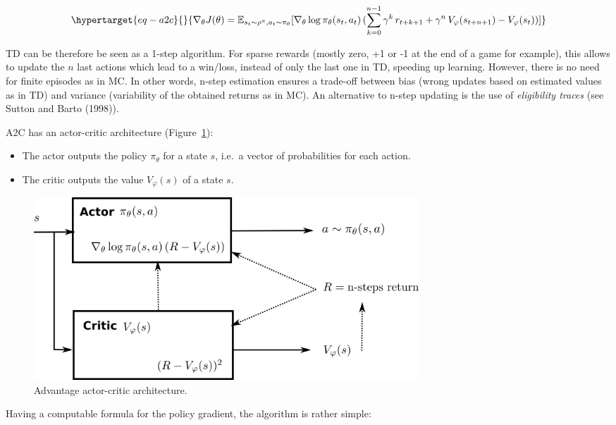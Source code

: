 \documentclass[
  letterpaper,
  DIV=11,
  numbers=noendperiod]{scrreprt}
\providecommand{\tightlist}{%
  \setlength{\itemsep}{0pt}\setlength{\parskip}{0pt}}\usepackage{longtable,booktabs,array}
\begin{document}
\begin{equation}\protect\hypertarget{eq-a2c}{}{
    \nabla_\theta J(\theta) =  \mathbb{E}_{s_t \sim \rho^\pi, a_t \sim \pi_\theta}[\nabla_\theta \log \pi_\theta(s_t, a_t) \, ( \sum_{k=0}^{n-1} \gamma^{k} \, r_{t+k+1} + \gamma^n \, V_\varphi(s_{t+n+1}) - V_\varphi(s_t))]
}\label{eq-a2c}\end{equation}

TD can be therefore be seen as a 1-step algorithm. For sparse rewards
(mostly zero, +1 or -1 at the end of a game for example), this allows to
update the \(n\) last actions which lead to a win/loss, instead of only
the last one in TD, speeding up learning. However, there is no need for
finite episodes as in MC. In other words, n-step estimation ensures a
trade-off between bias (wrong updates based on estimated values as in
TD) and variance (variability of the obtained returns as in MC). An
alternative to n-step updating is the use of \emph{eligibility traces}
(see Sutton and Barto (1998)).

A2C has an actor-critic architecture (Figure~\ref{fig-a3c}):

\begin{itemize}
\tightlist
\item
  The actor outputs the policy \(\pi_\theta\) for a state \(s\), i.e.~a
  vector of probabilities for each action.
\item
  The critic outputs the value \(V_\varphi(s)\) of a state \(s\).
\end{itemize}

\begin{figure}

{\centering \includegraphics[width=0.7\textwidth,height=\textheight]{./img/a3c.png}

}

\caption{\label{fig-a3c}Advantage actor-critic architecture.}

\end{figure}

Having a computable formula for the policy gradient, the algorithm is
rather simple:
\end{document}
